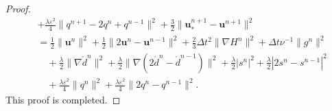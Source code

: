 \documentclass[10pt,a4paper]{amsart}
\newcommand{\dd}{\ensuremath{\acute d}}
\newcommand{\uu}{\mathrm{\textbf{u}}}
\begin{document}
\begin{proof}
\begin{align}
&+\frac{\lambda\varepsilon^2}{4}\|q^{n+1}-2q^n+q^{n-1}\|^2+\frac{3}{2}\|\uu_*^{n+1}-\uu^{n+1}\|^2\nonumber\\
&=\frac{1}{2}\|\uu^{n}\|^2+\frac{1}{2}\|2\uu^{n}-\uu^{n-1}\|^2+\frac{2}{3}\Delta t^2\|\nabla H^{n}\|^2+\Delta t\nu^{-1}\|g^{n}\|^2\nonumber\\
&\quad+\frac{\lambda}{2}\lVert\nabla\dd^{n}\rVert^2
+\frac{\lambda}{2}\lVert\nabla\left(2\dd^{n}-\dd^{n-1}\right)\rVert^2+\frac{\lambda}{2}|s^{n}|^2+\frac{\lambda}{2}|2s^{n}-s^{n-1}|^2\nonumber\\
&\quad+\frac{\lambda\varepsilon^2}{4}\|q^{n}\|^2+\frac{\lambda\varepsilon^2}{4}\|2q^{n}-q^{n-1}\|^2.
\end{align}
\fi
This proof is completed.
\end{proof}
\end{document}
